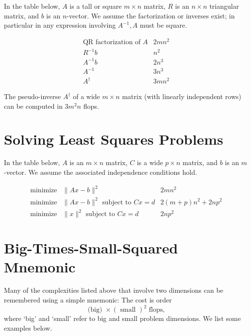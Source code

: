 In the table below, $ A $ is a tall or square $ m \times n $ matrix, $ R $ is an $ n \times n $ triangular matrix, and $ b $ is an $ n $-vector. We assume the factorization or inverses exist; in particular in any expression involving $ A^{-1}, A $ must be square.

\begin{equation} \begin{array}{ll}\mathrm{QR} \text { factorization of } A & 2 m n^{2} \\ R^{-1} b & n^{2} \\ A^{-1} b & 2 n^{3} \\ A^{-1} & 3 n^{3} \\ A^{\dagger} & 3 m n^{2}\end{array} \end{equation}

The pseudo-inverse $ A^{\dagger} $ of a wide $ m \times n $ matrix (with linearly independent rows) can be computed in $ 3 m^{2} n $ flops.

\section{Solving Least Squares Problems}

In the table below, $ A $ is an $ m \times n $ matrix, $ C $ is a wide $ p \times n $ matrix, and $ b $ is an $ m $-vector. We assume the associated independence conditions hold.

\begin{equation} \begin{array}{lll}\operatorname{minimize} & \|A x-b\|^{2} & 2 m n^{2} \\ \operatorname { minimize } & \|A x-b\|^{2} \text { subject to } C x=d & 2(m+p) n^{2}+2 n p^{2} \\ \operatorname { minimize } &\|x\|^{2} \text { subject to } C x=d & 2 n p^{2}\end{array} \end{equation}

\section{Big-Times-Small-Squared Mnemonic}

Many of the complexities listed above that involve two dimensions can be remembered using a simple mnemonic: The cost is order
\begin{equation}
\text { (big) } \times(\text { small })^{2} \text { flops, }
\end{equation}
where `big' and `small' refer to big and small problem dimensions. We list some examples below.

